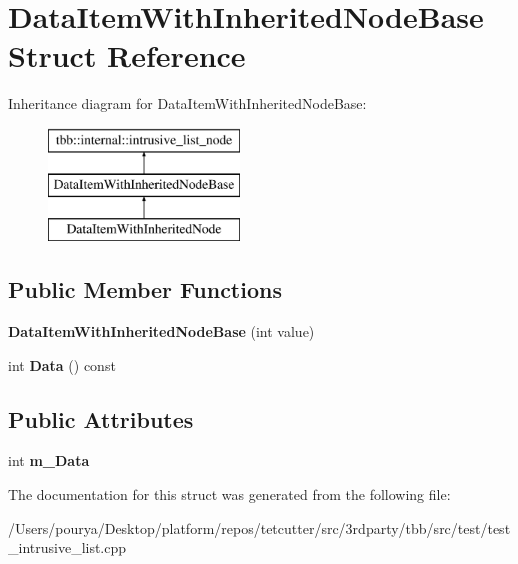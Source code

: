 \hypertarget{structDataItemWithInheritedNodeBase}{}\section{Data\+Item\+With\+Inherited\+Node\+Base Struct Reference}
\label{structDataItemWithInheritedNodeBase}
Inheritance diagram for Data\+Item\+With\+Inherited\+Node\+Base\+:\begin{figure}[H]
\begin{center}
\leavevmode
\includegraphics[height=3.000000cm]{structDataItemWithInheritedNodeBase}
\end{center}
\end{figure}
\subsection*{Public Member Functions}
\begin{DoxyCompactItemize}
\item 
\hypertarget{structDataItemWithInheritedNodeBase_a2b416e9e244d0c150499509d70e8c614}{}{\bfseries Data\+Item\+With\+Inherited\+Node\+Base} (int value)\label{structDataItemWithInheritedNodeBase_a2b416e9e244d0c150499509d70e8c614}

\item 
\hypertarget{structDataItemWithInheritedNodeBase_aa1b871c59a38a4c676261291e3164697}{}int {\bfseries Data} () const \label{structDataItemWithInheritedNodeBase_aa1b871c59a38a4c676261291e3164697}

\end{DoxyCompactItemize}
\subsection*{Public Attributes}
\begin{DoxyCompactItemize}
\item 
\hypertarget{structDataItemWithInheritedNodeBase_a58556a63193a7c6a1fa9f192d2058530}{}int {\bfseries m\+\_\+\+Data}\label{structDataItemWithInheritedNodeBase_a58556a63193a7c6a1fa9f192d2058530}

\end{DoxyCompactItemize}


The documentation for this struct was generated from the following file\+:\begin{DoxyCompactItemize}
\item 
/\+Users/pourya/\+Desktop/platform/repos/tetcutter/src/3rdparty/tbb/src/test/test\+\_\+intrusive\+\_\+list.\+cpp\end{DoxyCompactItemize}
